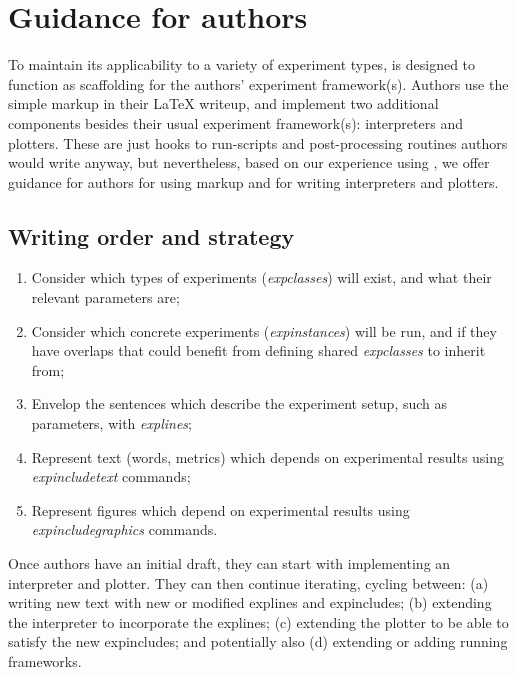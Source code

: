 \section{Guidance for authors}
\label{sec:guidance-for-authors}

To maintain its applicability to a variety of experiment types, \sysname is designed to function as scaffolding for the authors' experiment framework(s). Authors use the simple \experimentex markup in their \LaTeX{} writeup, and implement two additional components besides their usual experiment framework(s): interpreters and plotters. These are just hooks to run-scripts and post-processing routines authors would write anyway, but nevertheless, based on our experience using \sysname, we offer guidance for authors for using \experimentex markup and for writing interpreters and plotters.

\subsection{Writing order and strategy}
\label{sec:writing-strategy}

\begin{enumerate}[leftmargin=12pt,itemsep=2pt,topsep=2pt]
    \item Consider which types of experiments (\textit{expclasses}) will exist, and what their relevant parameters are;
    \item Consider which concrete experiments (\textit{expinstances}) will be run, and if they have overlaps that could benefit from defining shared \textit{expclasses} to inherit from;
    \item Envelop the sentences which describe the experiment setup, such as parameters, with \textit{explines};
    \item Represent text (\eg words, metrics) which depends on experimental results using \textit{expincludetext} commands;
    \item Represent figures which depend on experimental results using \textit{expincludegraphics} commands.
\end{enumerate}

\noindent Once authors have an initial draft, they can start with implementing an interpreter and plotter. They can then continue iterating, cycling between: (a) writing new text with new or modified explines and expincludes; (b) extending the interpreter to incorporate the explines; (c) extending the plotter to be able to satisfy the new expincludes; and potentially also (d) extending or adding running frameworks.

